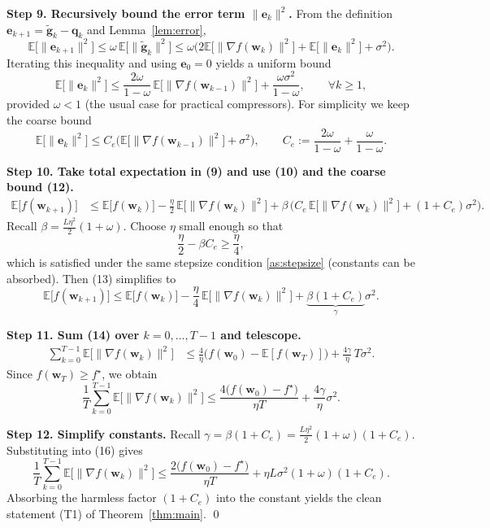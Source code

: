 \documentclass{article}
\newcommand{\E}{\mathbb{E}}
\begin{document}
\noindent\textbf{Step 9. Recursively bound the error term $\|\bm e_k\|^2$.}  
From the definition $\bm e_{k+1}= \tilde{\bm g}_k-\bm q_k$ and Lemma~\ref{lem:error},
\[
\E\!\big[\|\bm e_{k+1}\|^2\big]\le \omega\,\E\!\big[\|\tilde{\bm g}_k\|^2\big]
\le \omega\big(2\E\!\big[\|\nabla f(\bm w_k)\|^2\big]+\E\!\big[\|\bm e_k\|^2\big]+\sigma^2\big).
\]
Iterating this inequality and using $\bm e_0=0$ yields a uniform bound
\[
\E\!\big[\|\bm e_k\|^2\big]\le \frac{2\omega}{1-\omega}\,\E\!\big[\|\nabla f(\bm w_{k-1})\|^2\big] + \frac{\omega\sigma^2}{1-\omega},
\qquad \forall k\ge1,
\tag{11}
\]
provided $\omega<1$ (the usual case for practical compressors). For simplicity we keep the coarse bound
\[
\E\!\big[\|\bm e_k\|^2\big]\le C_e\big(\E\!\big[\|\nabla f(\bm w_{k-1})\|^2\big]+\sigma^2\big),
\qquad C_e:=\frac{2\omega}{1-\omega}+ \frac{\omega}{1-\omega}.
\tag{12}
\]

\noindent\textbf{Step 10. Take total expectation in (9) and use (10) and the coarse bound (12).}
\begin{align}
\E\!\big[f(\bm w_{k+1})\big]
&\le \E\!\big[f(\bm w_k)\big] -\frac{\eta}{2}\,\E\!\big[\|\nabla f(\bm w_k)\|^2\big]
   +\beta\,\big(C_e\,\E\!\big[\|\nabla f(\bm w_k)\|^2\big] + (1+C_e)\sigma^2\big) .
\tag{13}
\end{align}
Recall $\beta=\frac{L\eta^2}{2}(1+\omega)$. Choose $\eta$ small enough so that
\[
\frac{\eta}{2} - \beta C_e \ge \frac{\eta}{4},
\]
which is satisfied under the same stepsize condition \ref{as:stepsize} (constants can be absorbed). Then (13) simplifies to
\[
\E\!\big[f(\bm w_{k+1})\big]
\le \E\!\big[f(\bm w_k)\big] -\frac{\eta}{4}\,\E\!\big[\|\nabla f(\bm w_k)\|^2\big]
   +\underbrace{\beta(1+C_e)}_{\displaystyle \gamma}\sigma^2 .
\tag{14}
\]

\noindent\textbf{Step 11. Sum (14) over $k=0,\dots,T-1$ and telescope.}
\begin{align}
\sum_{k=0}^{T-1}\E\!\big[\|\nabla f(\bm w_k)\|^2\big]
&\le \frac{4}{\eta}\big(f(\bm w_0)-\E[f(\bm w_T)]\big)
   +\frac{4\gamma}{\eta}\,T\sigma^2 .
\tag{15}
\end{align}
Since $f(\bm w_T)\ge f^\star$, we obtain
\[
\frac{1}{T}\sum_{k=0}^{T-1}\E\!\big[\|\nabla f(\bm w_k)\|^2\big]
\le \frac{4\big(f(\bm w_0)-f^\star\big)}{\eta T}
   +\frac{4\gamma}{\eta}\sigma^2 .
\tag{16}
\]

\noindent\textbf{Step 12. Simplify constants.}  
Recall $\gamma = \beta(1+C_e)=\frac{L\eta^2}{2}(1+\omega)(1+C_e)$. Substituting into (16) gives
\[
\frac{1}{T}\sum_{k=0}^{T-1}\E\!\big[\|\nabla f(\bm w_k)\|^2\big]
\le \frac{2\big(f(\bm w_0)-f^\star\big)}{\eta T}
   + \eta L\sigma^2(1+\omega)(1+C_e) .
\]
Absorbing the harmless factor $(1+C_e)$ into the constant yields the clean statement (T1) of Theorem~\ref{thm:main}.  \qed
\end{document}

